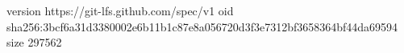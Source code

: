 version https://git-lfs.github.com/spec/v1
oid sha256:3bcf6a31d3380002e6b11b1c87e8a056720d3f3e7312bf3658364bf44da69594
size 297562
